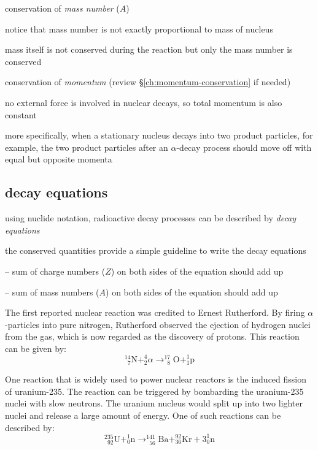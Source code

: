 \cmt conservation of \emph{mass number} ($A$)

notice that mass number is not exactly proportional to mass of nucleus

mass itself is not conserved during the reaction but only the mass number is conserved

\cmt conservation of \emph{momentum} (review \S\ref{ch:momentum-conservation} if needed)

no external force is involved in nuclear decays, so total momentum is also constant

more specifically, when a stationary nucleus decays into two product particles, for example, the two product particles after an $\alpha$-decay process should move off with equal but opposite momenta


\subsection{decay equations}

using nuclide notation, radioactive decay processes can be described by \emph{decay equations}

the conserved quantities provide a simple guideline to write the decay equations 

\begin{compactenum}
	\item[--] sum of charge numbers ($Z$) on both sides of the equation should add up
	
	\item[--] sum of mass numbers ($A$) on both sides of the equation should add up
\end{compactenum}


The first reported nuclear reaction was credited to Ernest Rutherford. By firing $\alpha$-particles into pure nitrogen, Rutherford observed the ejection of hydrogen nuclei from the gas, which is now regarded as the discovery of protons. This reaction can be given by:
\begin{equation*}
_{\phantom{0}7}^{14} \text{N} + _2^4 \alpha \longrightarrow _{\phantom{0}8}^{17} \text{O} + _{1}^{1} \text{p} 
\end{equation*} 


One reaction that is widely used to power nuclear reactors is the induced fission of uranium-235. The reaction can be triggered by bombarding the uranium-235 nuclei with slow neutrons. The uranium nucleus would split up into two lighter nuclei and release a large amount of energy. One of such reactions can be described by:
\begin{equation*}
 _{\phantom{0}92}^{235} \text{U} + _0^1 \text{n} \longrightarrow _{\phantom{0}56}^{141} \text{Ba} + _{36}^{92} \text{Kr} + 3_0^1 \text{n} 
\end{equation*} 




